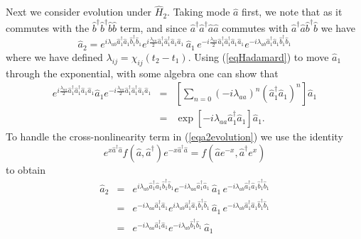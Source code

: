 \documentclass{iopart}
\begin{document}
Next we consider evolution under $\hat{H}_2$. Taking mode $\hat{a}$ first, we note that as it commutes with the $\hat{b}^{\dagger} \hat{b}^{\dagger} \hat{b} \hat{b}$ term, and since $\hat{a}^{\dagger} \hat{a}^{\dagger} \hat{a} \hat{a}$ commutes with $\hat{a}^{\dagger} \hat{a} \hat{b}^{\dagger} \hat{b}$ we have
\begin{equation}
\hat{a}_2 = e^{i \lambda_{ab} \hat{a}_1^{\dagger} \hat{a}_1 \hat{b}_1^{\dagger} \hat{b}_1 } 
          e^{ i \frac{\lambda_{aa}} {2} \hat{a}_1^{\dagger} \hat{a}_1^{\dagger} \hat{a}_1 \hat{a}_1}\, \hat{a}_1 \,  
          e^{ -i \frac{\lambda_{aa}}{2} \hat{a}_1^{\dagger} \hat {a}_1^{\dagger} \hat{a}_1 \hat{a}_1 }
          e^{-i \lambda_{ab} \hat{a}_1^{\dagger} \hat{a}_1 \hat{b}_1^{\dagger} \hat{b}_1}
\label{eqa2evolution}
\end{equation}
where we have defined $\lambda_{ij} = \chi_{ij} (t_2-t_1)$. Using (\ref{eqHadamard}) to move $\hat{a}_1$ through the exponential, with some algebra one can show that
\begin{eqnarray}
e^{ i \frac{\lambda_{aa}} {2} \hat{a}_1^{\dagger} \hat{a}_1^{\dagger} \hat{a}_1 \hat{a}_1} \hat{a}_1 
         e^{ -i \frac{\lambda_{aa}} {2} \hat{a}_1^{\dagger} \hat{a}_1^{\dagger} \hat{a}_1 \hat{a}_1} &=& \left[ \sum_{n=0} (-i \lambda_{aa})^n (\hat{a}_1^{\dagger} \hat{a}_1)^n \right] \hat{a}_1 \nonumber \nonumber \\
   &=& \exp[-i \lambda_{aa} \hat{a}_1^{\dagger} \hat{a}_1] \hat{a}_1.
\end{eqnarray}
To handle the cross-nonlinearity term in (\ref{eqa2evolution}) we use the identity \cite{louisell}
\begin{equation}
e^{x \hat{a}^{\dagger} \hat{a}} f(\hat{a}, \hat{a}^{\dagger}) e^{-x \hat{a}^{\dagger} \hat{a}} = f(\hat{a}e^{-x}, \hat{a}^{\dagger} e^{x})
\label{eqefeidentity}
\end{equation}
to obtain
\begin{eqnarray}
\hat{a}_2 &=& e^{i \lambda_{ab} \hat{a}_1^{\dagger} \hat{a}_1 \hat{b}_1^{\dagger} \hat{b}_1 } 
          e^{-i \lambda_{aa} \hat{a}_1^{\dagger} \hat{a}_1} \, \hat{a}_1 \,
          e^{-i \lambda_{ab} \hat{a}_1^{\dagger} \hat{a}_1 \hat{b}_1^{\dagger} \hat{b}_1} \nonumber \\
%
          &=& e^{-i \lambda_{aa} \hat{a}_1^{\dagger} \hat{a}_1} 
              e^{i \lambda_{ab} \hat{a}_1^{\dagger} \hat{a}_1 \hat{b}_1^{\dagger} \hat{b}_1 } \, \hat{a}_1 \,
          e^{-i \lambda_{ab} \hat{a}_1^{\dagger} \hat{a}_1 \hat{b}_1^{\dagger} \hat{b}_1} \nonumber \\
%
          &=& e^{-i \lambda_{aa} \hat{a}_1^{\dagger} \hat{a}_1} e^{-i \lambda_{ab} \hat{b}_1^{\dagger} \hat{b}_1} \, \hat{a}_1
\label{eqa2}
\end{eqnarray}
\end{document}
